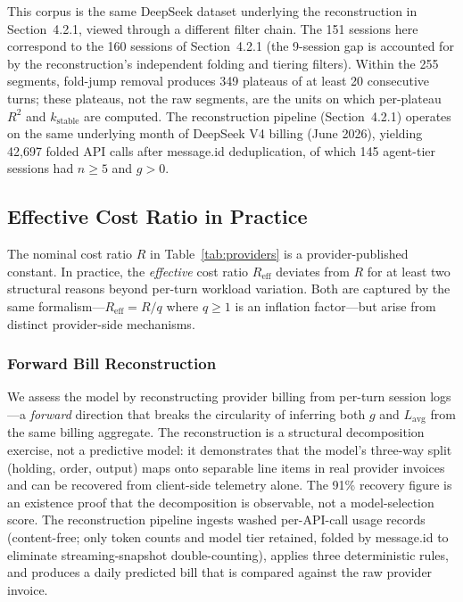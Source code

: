 \documentclass[11pt]{article}
\theoremstyle{definition}
\theoremstyle{remark}
\begin{document}
This corpus is the same DeepSeek dataset underlying the reconstruction in Section~4.2.1, viewed through a different filter chain. The 151 sessions here correspond to the 160 sessions of Section~4.2.1 (the 9-session gap is accounted for by the reconstruction's independent folding and tiering filters). Within the 255 segments, fold-jump removal produces 349 plateaus of at least 20 consecutive turns; these plateaus, not the raw segments, are the units on which per-plateau $R^2$ and $k_{\text{stable}}$ are computed. The reconstruction pipeline (Section~4.2.1) operates on the same underlying month of DeepSeek V4 billing (June 2026), yielding 42,697 folded API calls after message.id deduplication, of which 145 agent-tier sessions had $n \ge 5$ and $g > 0$.

\subsection{Effective Cost Ratio in Practice}

The nominal cost ratio $R$ in Table~\ref{tab:providers} is a provider-published constant. In practice, the \emph{effective} cost ratio $R_{\text{eff}}$ deviates from $R$ for at least two structural reasons beyond per-turn workload variation. Both are captured by the same formalism---$R_{\text{eff}} = R / q$ where $q \ge 1$ is an inflation factor---but arise from distinct provider-side mechanisms.

\subsubsection{Forward Bill Reconstruction}

We assess the model by reconstructing provider billing from per-turn session logs---a \emph{forward} direction that breaks the circularity of inferring both $g$ and $L_{\text{avg}}$ from the same billing aggregate. The reconstruction is a structural decomposition exercise, not a predictive model: it demonstrates that the model's three-way split (holding, order, output) maps onto separable line items in real provider invoices and can be recovered from client-side telemetry alone. The 91\% recovery figure is an existence proof that the decomposition is observable, not a model-selection score. The reconstruction pipeline ingests washed per-API-call usage records (content-free; only token counts and model tier retained, folded by message.id to eliminate streaming-snapshot double-counting), applies three deterministic rules, and produces a daily predicted bill that is compared against the raw provider invoice.
\end{document}
